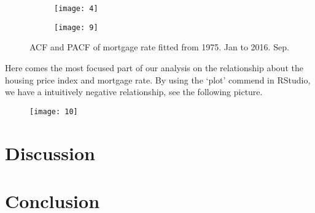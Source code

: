 \documentclass[12pt,letterpaper]{article}
\begin{document}
\begin{figure*}[h!]
\begin{subfigure}[b]{0.4\textwidth}
\begin{center}
 \texttt{[image: 4]}
 \vspace{-0.4cm}
\end{center}
\end{subfigure}
\qquad
\qquad
\begin{subfigure}[b]{0.4\textwidth}
\begin{center}
 \texttt{[image: 9]}
 \vspace{-0.4cm}
\end{center}
\end{subfigure}
 \vspace{-.1cm}
 \caption{ ACF and PACF of mortgage rate fitted from 1975. Jan to 2016. Sep.}
      \label{fig:time}
\vspace{-.25cm}
\end{figure*}

Here comes the most focused part of our analysis on the relationship about the housing price index and mortgage rate. 
By using the `plot' commend in RStudio, we have a intuitively negative relationship, see the following picture.

\begin{figure}[h!]
\centering
 \texttt{[image: 10]}\\
\end{figure}



\section{Discussion}

\section{Conclusion}
\end{document}
